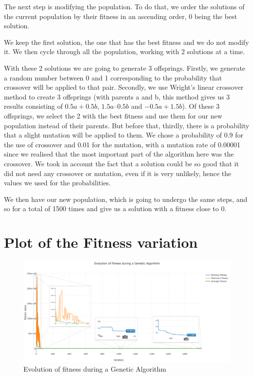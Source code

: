 \documentclass[12pt]{article}
\begin{document}
The next step is modifying the population. To do that, we order the solutions of the current population by their fitness in an ascending order, 0 being the best solution.

We keep the first solution, the one that has the best fitness and we do not modify it. We then cycle through all the population, working with 2 solutions at a time.

With these 2 solutions we are going to generate 3 offsprings. Firstly, we generate a random number between 0 and 1 corresponding to the probability that crossover will be applied to that pair. Secondly, we use Wright's linear crossover method to create 3 offsprings (with parents a and b, this method gives us 3 results consisting of $0.5a + 0.5b$, $1.5a – 0.5b$ and $-0.5a + 1.5b$). Of these 3 offsprings, we select the 2 with the best fitness and use them for our new population instead of their parents. But before that, thirdly, there is a probability that a slight mutation will be applied to them. We chose a probability of 0.9 for the use of crossover and 0.01 for the mutation, with a mutation rate of 0.00001 since we realised that the most important part of the algorithm here was the crossover. We took in account the fact that a solution could be so good that it did not need any crossover or mutation, even if it is very unlikely, hence the values we used for the probabilities.

We then have our new population, which is going to undergo the same steps, and so for a total of 1500 times and give us a solution with a fitness close to 0.

\section{Plot of the Fitness variation}

\begin{figure}[H]
	\centering
	\includegraphics[width=1.0\columnwidth, angle=270]{./plot_fitness_evolution.png}
	\caption{Evolution of fitness during a Genetic Algorithm}
\end{figure}
\end{document}
